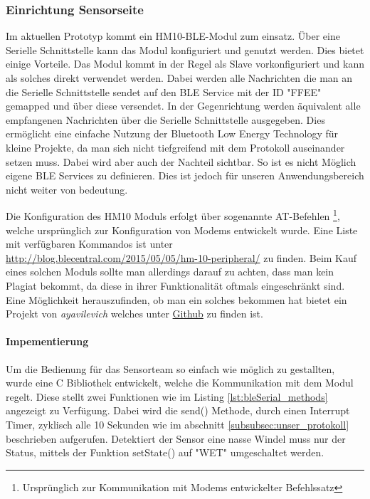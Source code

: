 \subsubsection{Einrichtung Sensorseite}
Im aktuellen Prototyp kommt ein HM10-BLE-Modul zum einsatz. Über eine Serielle Schnittstelle kann das Modul konfiguriert und genutzt werden. Dies bietet einige Vorteile. Das Modul kommt in der Regel als Slave vorkonfiguriert und kann als solches direkt verwendet werden. Dabei werden alle Nachrichten die man an die Serielle Schnittstelle sendet auf den BLE Service mit der ID "FFEE" gemapped und über diese versendet. In der Gegenrichtung werden äquivalent alle empfangenen Nachrichten über die Serielle Schnittstelle ausgegeben. Dies ermöglicht eine einfache Nutzung der Bluetooth Low Energy Technology für kleine Projekte, da man sich nicht tiefgreifend mit dem Protokoll auseinander setzen muss. Dabei wird aber auch der Nachteil sichtbar. So ist es nicht Möglich eigene BLE Services zu definieren. Dies ist jedoch für unseren Anwendungsbereich nicht weiter von bedeutung. 

Die Konfiguration des HM10 Moduls erfolgt über sogenannte AT-Befehlen \footnote{Ursprünglich zur Kommunikation mit Modems entwickelter Befehlssatz}, welche ursprünglich zur Konfiguration von Modems entwickelt wurde. Eine Liste mit verfügbaren Kommandos ist unter \url{http://blog.blecentral.com/2015/05/05/hm-10-peripheral/} zu finden. Beim Kauf eines solchen Moduls sollte man allerdings darauf zu achten, dass man kein Plagiat bekommt, da diese in ihrer Funktionalität oftmals eingeschränkt sind. Eine Möglichkeit herauszufinden, ob man ein solches bekommen hat bietet ein Projekt von \textit{ayavilevich} welches unter \href{https://github.com/ayavilevich/arduino-ble-ident-n-set}{Github} zu finden ist.

\paragraph{Impementierung}
Um die Bedienung für das Sensorteam so einfach wie möglich zu gestallten, wurde eine C Bibliothek entwickelt, welche die Kommunikation mit dem Modul regelt. Diese stellt zwei Funktionen wie im Listing \ref{lst:bleSerial_methods} angezeigt zu Verfügung. Dabei wird die send() Methode, durch einen Interrupt Timer, zyklisch alle 10 Sekunden wie im abschnitt \ref{subsubsec:unser_protokoll} beschrieben aufgerufen. Detektiert der Sensor eine nasse Windel muss nur der Status, mittels der Funktion setState() auf "WET" umgeschaltet werden.

